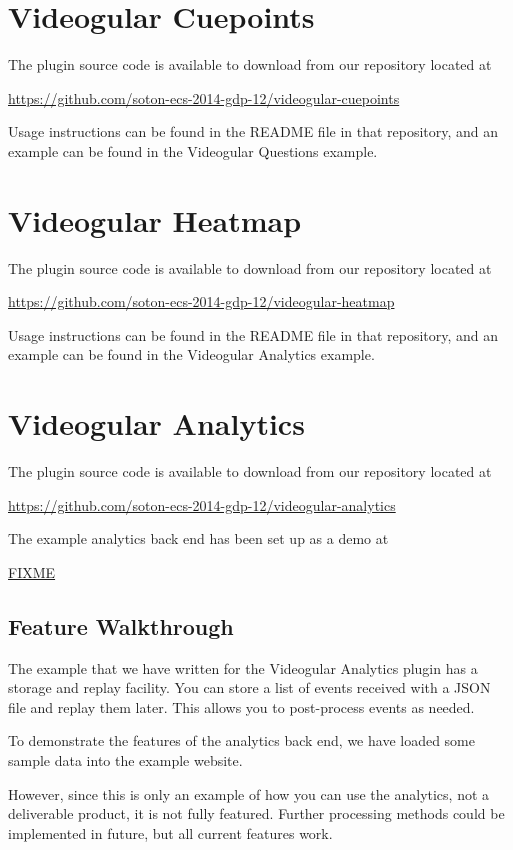 \documentclass[12pt,a4paper]{article}
\begin{document}
\section{Videogular Cuepoints}

The plugin source code is available to download from our repository located at

\url{https://github.com/soton-ecs-2014-gdp-12/videogular-cuepoints}

Usage instructions can be found in the README file in that repository, and an example can be found in the Videogular Questions example.

\section{Videogular Heatmap}

The plugin source code is available to download from our repository located at

\url{https://github.com/soton-ecs-2014-gdp-12/videogular-heatmap}

Usage instructions can be found in the README file in that repository, and an example can be found in the Videogular Analytics example.

\section{Videogular Analytics}

The plugin source code is available to download from our repository located at

\url{https://github.com/soton-ecs-2014-gdp-12/videogular-analytics}

The example analytics back end has been set up as a demo at

\url{FIXME}

\subsection{Feature Walkthrough}

The example that we have written for the Videogular Analytics plugin has a storage and replay facility. You can store a list of events received with a JSON file and replay them later. This allows you to post-process events as needed.

To demonstrate the features of the analytics back end, we have loaded some sample data into the example website.

However, since this is only an example of how you can use the analytics, not a deliverable product, it is not fully featured. Further processing methods could be implemented in future, but all current features work.
\end{document}
